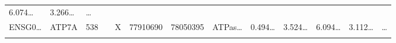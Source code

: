 \documentclass[
]{article}
\begin{document}
\begin{longtable}[]{@{}lllllllllllll@{}}
\begin{minipage}[t]{0.05\columnwidth}
6.074\ldots{}\strut
\end{minipage} & \begin{minipage}[t]{0.05\columnwidth}\raggedright
3.266\ldots{}\strut
\end{minipage} & \begin{minipage}[t]{0.02\columnwidth}\raggedright
\ldots{}\strut
\end{minipage}\tabularnewline
\begin{minipage}[t]{0.05\columnwidth}\raggedright
ENSG0\ldots{}\strut
\end{minipage} & \begin{minipage}[t]{0.05\columnwidth}\raggedright
ATP7A\strut
\end{minipage} & \begin{minipage}[t]{0.05\columnwidth}\raggedright
538\strut
\end{minipage} & \begin{minipage}[t]{0.05\columnwidth}\raggedright
\strut
\end{minipage} & \begin{minipage}[t]{0.05\columnwidth}\raggedright
X\strut
\end{minipage} & \begin{minipage}[t]{0.05\columnwidth}\raggedright
77910690\strut
\end{minipage} & \begin{minipage}[t]{0.05\columnwidth}\raggedright
78050395\strut
\end{minipage} & \begin{minipage}[t]{0.05\columnwidth}\raggedright
ATPas\ldots{}\strut
\end{minipage} & \begin{minipage}[t]{0.05\columnwidth}\raggedright
0.494\ldots{}\strut
\end{minipage} & \begin{minipage}[t]{0.05\columnwidth}\raggedright
3.524\ldots{}\strut
\end{minipage} & \begin{minipage}[t]{0.05\columnwidth}\raggedright
6.094\ldots{}\strut
\end{minipage} & \begin{minipage}[t]{0.05\columnwidth}\raggedright
3.112\ldots{}\strut
\end{minipage} & \begin{minipage}[t]{0.02\columnwidth}\raggedright
\ldots{}\strut
\end{minipage}\tabularnewline
\begin{minipage}[t]{0.05\columnwidth}\raggedright

\end{minipage}
\end{longtable}
\end{document}
